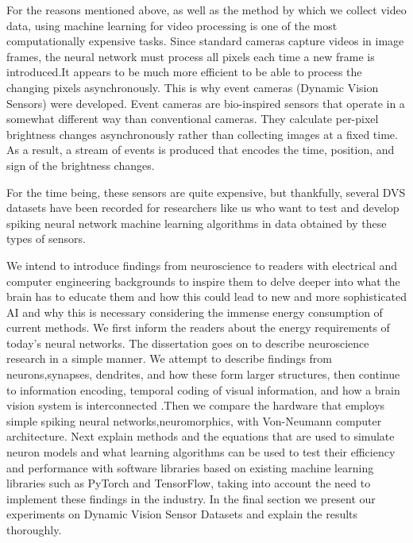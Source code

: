 \documentclass[12pt]{report}
\begin{document}
For the reasons mentioned above, as well as the method by which we collect video data, using machine learning for video processing is one of the most computationally expensive tasks. Since standard cameras capture videos in image frames, the neural network must process all pixels each time a new frame is introduced.It appears to be much more efficient to be able to process the changing pixels asynchronously. This is why event cameras (Dynamic Vision Sensors) were developed. Event cameras are bio-inspired sensors that operate in a somewhat different way than conventional cameras. They calculate per-pixel brightness changes asynchronously rather than collecting images at a fixed time. As a result, a stream of events is produced that encodes the time, position, and sign of the brightness changes.

For the time being, these sensors are quite expensive, but thankfully, several DVS datasets have been recorded for researchers like us who want to test and develop spiking neural network machine learning algorithms in data obtained by these types of sensors.

We intend to introduce findings from neuroscience to readers with electrical and computer engineering backgrounds to inspire them to delve deeper into what the brain has to educate them and how this could lead to new and more sophisticated AI and why this is necessary considering the immense energy consumption of current methods. We first inform the readers about the energy requirements of today's neural networks. The dissertation goes on to describe neuroscience research in a simple manner. We attempt to describe findings from neurons,synapses, dendrites, and how these form larger structures, then continue to information encoding, temporal coding of visual information, and how a brain vision system is interconnected .Then we compare the hardware that employs simple spiking neural networks,neuromorphics, with Von-Neumann computer architecture. Next explain methods and the equations that are used to simulate neuron models and what learning algorithms can be used to test their efficiency and performance with software libraries based on existing machine learning libraries such as PyTorch and TensorFlow, taking into account the need to implement these findings in the industry. In the final section we present our experiments on Dynamic Vision Sensor Datasets and explain the results thoroughly.
\end{document}
